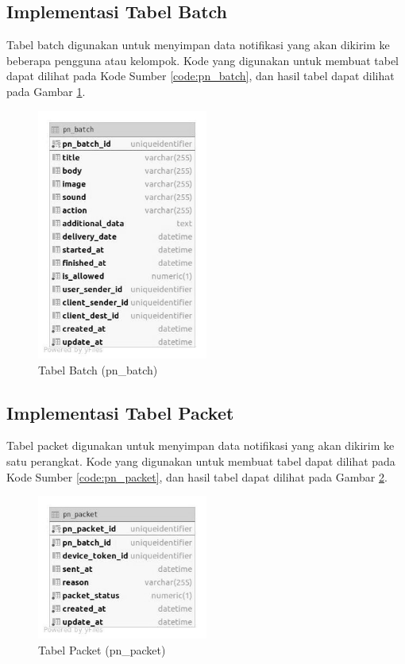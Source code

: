 \subsection{Implementasi Tabel Batch}
\par Tabel batch digunakan untuk menyimpan data notifikasi yang akan dikirim ke beberapa pengguna atau kelompok. Kode yang digunakan untuk membuat tabel dapat dilihat pada Kode Sumber \ref{code:pn_batch}, dan hasil tabel dapat dilihat pada Gambar \ref{tabel_pn_batch}.

\begin{figure}[H]
    \centering\includegraphics[width=0.5\textwidth]{bab4/figures/tabel_pn_batch.jpg}
    \caption{Tabel Batch (pn\_batch)}
    \label{tabel_pn_batch}
\end{figure}

\subsection{Implementasi Tabel Packet}
\par Tabel packet digunakan untuk menyimpan data notifikasi yang akan dikirim ke satu perangkat. Kode yang digunakan untuk membuat tabel dapat dilihat pada Kode Sumber \ref{code:pn_packet}, dan hasil tabel dapat dilihat pada Gambar \ref{tabel_pn_packet}.

\begin{figure}[H]
    \centering\includegraphics[width=0.5\textwidth]{bab4/figures/tabel_pn_packet.jpg}
    \caption{Tabel Packet (pn\_packet)}
    \label{tabel_pn_packet}
\end{figure}

